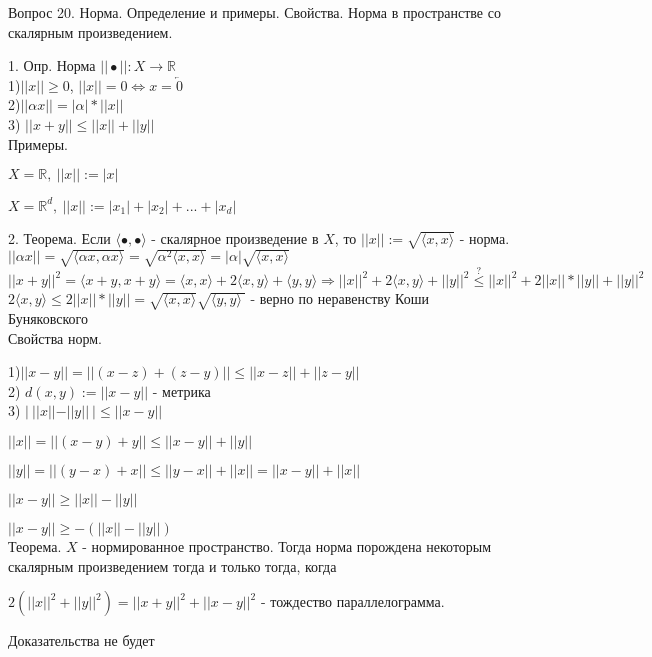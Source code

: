 \documentclass[12pt]{article}
\begin{document}
\begin{center}
Вопрос 20. Норма. Определение и примеры. Свойства. Норма в пространстве со скалярным произведением.
\end{center}

1. Опр. Норма $||\bullet || : X\to \mathbb{R}$\\

1)$||x|| \geq 0$, $||x|| = 0 \Leftrightarrow x = \overleftarrow{0}$\\

2)$||\alpha x|| = |\alpha|*||x||$\\

3) $||x+y|| \leq ||x||+||y||$\\

Примеры.

$X = \mathbb{R},\ ||x||:=|x|$

$X = \mathbb{R}^d,\ ||x||:=|x_1|+|x_2|+...+|x_d|$

2. Теорема. Если $\langle \bullet, \bullet \rangle$ - скалярное произведение в $X$, то $||x||:= \sqrt{\langle x, x \rangle}$ - норма.\\

$||\alpha x|| = \sqrt{\langle \alpha x, \alpha x\rangle} = \sqrt{\alpha^2 \langle x, x\rangle} = |\alpha|\sqrt{\langle x, x \rangle}$\\

$||x+y||^2 = \langle x+y, x+y \rangle = \langle x,x\rangle + 2\langle x, y\rangle + \langle y, y\rangle \Rightarrow ||x||^2 + 2\langle x, y\rangle + ||y||^2 \overset{?}{\leq} ||x||^2 + 2||x||*||y|| + ||y||^2$\\

$2\langle x, y \rangle \leq 2||x||*||y|| = \sqrt{\langle x, x\rangle}\sqrt{\langle y, y\rangle\ }$ - верно по неравенству Коши Буняковского\\

Свойства норм.

1)$||x-y||=||(x-z)+(z-y)|| \leq 	||x-z||+||z-y||$\\

2) $d(x, y):=||x-y||$ - метрика\\

3) $|\ ||x||-||y||\ | \leq ||x-y||$

$||x|| = ||(x-y)+y|| \leq ||x-y||+||y||$

$||y|| = ||(y-x)+x|| \leq ||y-x||+||x||=||x-y||+||x||$ 

$||x-y||\geq ||x||-||y||$

$||x-y||\geq -(||x||-||y||)$\\

Теорема. $X$ - нормированное пространство. Тогда норма порождена некоторым скалярным произведением тогда и только тогда, когда

$2(||x||^2+||y||^2)=||x+y||^2+||x-y||^2$ - тождество параллелограмма.

Доказательства не будет
\end{document}
